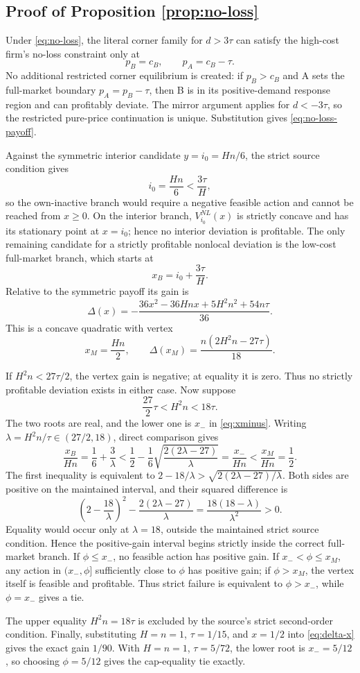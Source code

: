 \subsection{Proof of Proposition \ref{prop:no-loss}}

Under \eqref{eq:no-loss}, the literal corner family for \(d>3\tau\) can
satisfy the high-cost firm's no-loss constraint only at
\[
p_B=c_B,\qquad p_A=c_B-\tau.
\]
No additional restricted corner equilibrium is created: if \(p_B>c_B\) and A
sets the full-market boundary \(p_A=p_B-\tau\), then B is in its
positive-demand response region and can profitably deviate.  The mirror argument
applies for \(d<-3\tau\), so the restricted pure-price continuation is
unique.  Substitution gives \eqref{eq:no-loss-payoff}.

Against the symmetric interior candidate \(y=i_0=Hn/6\), the strict source
condition gives
\[
i_0=\frac{Hn}{6}<\frac{3\tau}{H},
\]
so the own-inactive branch would require a negative feasible action and cannot
be reached from \(x\ge0\).  On the interior branch,
\(V_{i_0}^{NL}(x)\) is strictly concave and has its stationary point at
\(x=i_0\); hence no interior deviation is profitable.  The only remaining
candidate for a strictly profitable nonlocal deviation is the low-cost
full-market branch, which starts at
\[
x_B=i_0+\frac{3\tau}{H}.
\]
Relative to the symmetric payoff its gain is
\begin{equation}
\Delta(x)
=
-\frac{
36x^2-36Hnx+5H^2n^2+54n\tau
}{36}.
\label{eq:delta-x}
\end{equation}
This is a concave quadratic with vertex
\[
x_M=\frac{Hn}{2},
\qquad
\Delta(x_M)
=
\frac{n(2H^2n-27\tau)}{18}.
\]

If \(H^2n<27\tau/2\), the vertex gain is negative; at equality it is zero.
Thus no strictly profitable deviation exists in either case.  Now suppose
\[
\frac{27}{2}\tau<H^2n<18\tau.
\]
The two roots are real, and the lower one is \(x_-\) in
\eqref{eq:xminus}.  Writing
\(\lambda=H^2n/\tau\in(27/2,18)\), direct comparison gives
\[
\frac{x_B}{Hn}
=
\frac16+\frac3\lambda
<
\frac12
-
\frac16\sqrt{\frac{2(2\lambda-27)}{\lambda}}
=
\frac{x_-}{Hn}
<
\frac{x_M}{Hn}
=
\frac12.
\]
The first inequality is equivalent to
\(2-18/\lambda>
\sqrt{2(2\lambda-27)/\lambda}\).  Both sides are positive on the
maintained interval, and their squared difference is
\[
\left(2-\frac{18}{\lambda}\right)^2
-\frac{2(2\lambda-27)}{\lambda}
=\frac{18(18-\lambda)}{\lambda^2}>0.
\]
Equality would occur only at \(\lambda=18\), outside the maintained strict
source condition.  Hence the positive-gain
interval begins strictly inside the correct full-market branch.  If
\(\phi\le x_-\), no feasible action has positive gain.  If
\(x_-<\phi\le x_M\), any action in \((x_-,\phi]\) sufficiently close
to \(\phi\) has positive gain; if \(\phi>x_M\), the vertex itself is
feasible and profitable.  Thus strict failure is equivalent to
\(\phi>x_-\), while \(\phi=x_-\) gives a tie.

The upper equality \(H^2n=18\tau\) is excluded by the source's strict
second-order condition.  Finally, substituting
\(H=n=1\), \(\tau=1/15\), and \(x=1/2\) into
\eqref{eq:delta-x} gives the exact gain \(1/90\).  With
\(H=n=1\), \(\tau=5/72\), the lower root is \(x_-=5/12\), so choosing
\(\phi=5/12\) gives the cap-equality tie exactly.
